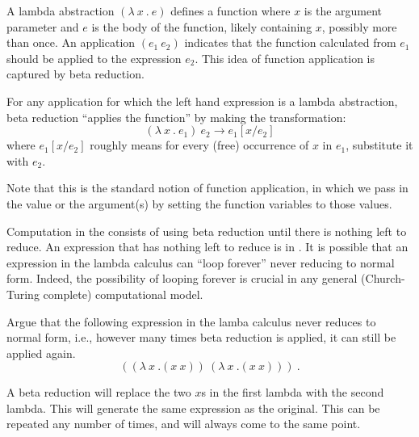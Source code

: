 \begin{gram}{}
A lambda abstraction $(\lambda~x~.~e)$  defines a function where $x$ is the argument parameter 
and $e$ is the body of the function, likely containing $x$, possibly
more than once.    An application $(e_1~e_2)$ indicates 
that the function calculated from $e_1$ should be applied to the expression $e_2$.   This idea 
of function application is captured by beta reduction. 
\end{gram}

\begin{definition}
\label{def:lc::beta}
For any application for which the left hand expression is a lambda abstraction, beta reduction ``applies the function'' by making the 
transformation: 
\[ (\lambda~x~.~e_1)~e_2 \longrightarrow e_1[x/e_2] \]
where $e_1[x/e_2]$ roughly means for every (free) occurrence of $x$ in 
$e_1$, substitute it with $e_2$.  
\end{definition}

\begin{flex}

  \begin{gram}
Note that this is the standard notion of function application, in
which we pass in the value or the argument(s) by setting the function variables
to those values.

Computation in the \lc{} consists of 
using beta reduction until there is nothing left to reduce.  
An expression that has nothing left to reduce is in .
It is possible that an expression in the lambda calculus can ``loop
forever'' never reducing to normal form.   Indeed, the possibility of
looping forever is crucial in any general (Church-Turing complete) computational model.
\end{gram}

\begin{exercise}
Argue that the following expression in the lamba calculus never
reduces to normal form, i.e., however many times beta reduction is
applied, it can still be applied again.
\[ ((\lambda~x~.(x~x))~(\lambda~x~.(x~x)))~.\]
\end{exercise}

\begin{solution}
A beta reduction will replace the two $x$s in the first lambda with
the second lambda.    This will generate the same expression as the
original.   This can be repeated any number of times, and will always
come to the same point.
\end{solution}

\end{flex}

